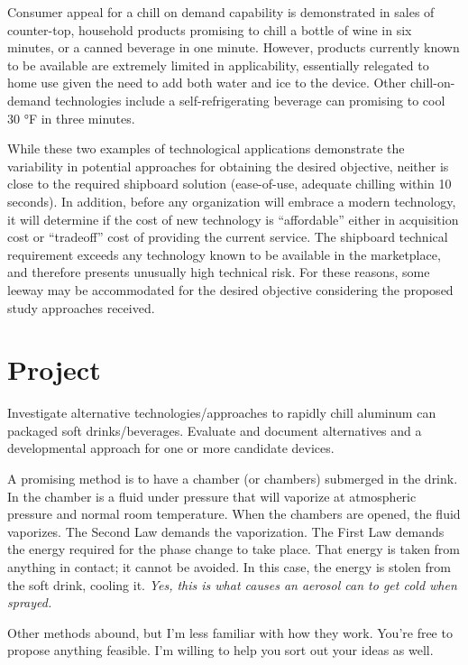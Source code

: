 \documentclass[
]{book}
\begin{document}
Consumer appeal for a chill on demand capability is demonstrated in sales of counter-top, household products promising to chill a bottle of wine in six minutes, or a canned beverage in one minute. However, products currently known to be available are extremely limited in applicability, essentially relegated to home use given the need to add both water and ice to the device. Other chill-on-demand technologies include a self-refrigerating beverage can promising to cool 30 °F in three minutes.

While these two examples of technological applications demonstrate the variability in potential approaches for obtaining the desired objective, neither is close to the required shipboard solution (ease-of-use, adequate chilling within 10 seconds). In addition, before any organization will embrace a modern technology, it will determine if the cost of new technology is ``affordable'' either in acquisition cost or ``tradeoff'' cost of providing the current service. The shipboard technical requirement exceeds any technology known to be available in the marketplace, and therefore presents unusually high technical risk. For these reasons, some leeway may be accommodated for the desired objective considering the proposed study approaches received.

\hypertarget{project}{%
\section{Project}\label{project}}

Investigate alternative technologies/approaches to rapidly chill aluminum can packaged soft drinks/beverages. Evaluate and document alternatives and a developmental approach for one or more candidate devices.

A promising method is to have a chamber (or chambers) submerged in the drink. In the chamber is a fluid under pressure that will vaporize at atmospheric pressure and normal room temperature. When the chambers are opened, the fluid vaporizes. The Second Law demands the vaporization. The First Law demands the energy required for the phase change to take place. That energy is taken from anything in contact; it cannot be avoided. In this case, the energy is stolen from the soft drink, cooling it. \emph{Yes, this is what causes an aerosol can to get cold when sprayed.}

Other methods abound, but I'm less familiar with how they work. You're free to propose anything feasible. I'm willing to help you sort out your ideas as well.
\end{document}
